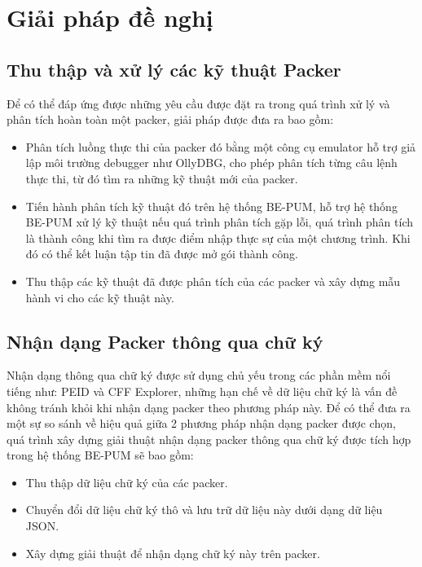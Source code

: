 \section{Giải pháp đề nghị}

\subsection {Thu thập và xử lý các kỹ thuật Packer}

\hspace{0.5cm}Để có thể đáp ứng được những yêu cầu được đặt ra trong quá trình xử lý và phân tích hoàn toàn một packer, giải pháp được đưa ra bao gồm:

\begin{itemize}
\item{Phân tích luồng thực thi của packer đó bằng một công cụ emulator hỗ trợ giả lập môi trường debugger như OllyDBG, cho phép phân tích từng câu lệnh thực thi, từ đó tìm ra những kỹ thuật mới của packer.\\}
\item{Tiến hành phân tích kỹ thuật đó trên hệ thống BE-PUM, hỗ trợ hệ thống BE-PUM xử lý kỹ thuật nếu quá trình phân tích gặp lỗi, quá trình phân tích là thành công khi tìm ra được điểm nhập thực sự của một chương trình. Khi đó có thể kết luận tập tin đã được mở gói thành công.\\}
\item{Thu thập các kỹ thuật đã được phân tích của các packer và xây dựng mẫu hành vi cho các kỹ thuật này.}
\end{itemize} 

\subsection {Nhận dạng Packer thông qua chữ ký}

\hspace{0.5cm}Nhận dạng thông qua chữ ký được sử dụng chủ yếu trong các phần mềm nổi tiếng như: PEID và CFF Explorer, những hạn chế về dữ liệu chữ ký là vấn đề không tránh khỏi khi nhận dạng packer theo phương pháp này. Để có thể đưa ra một sự so sánh về hiệu quả giữa 2 phương pháp nhận dạng packer được chọn, quá trình xây dựng giải thuật nhận dạng packer thông qua chữ ký được tích hợp trong hệ thống BE-PUM sẽ bao gồm:

\begin{itemize}
\item{Thu thập dữ liệu chữ ký của các packer.\\}
\item{Chuyển đổi dữ liệu chữ ký thô và lưu trữ dữ liệu này dưới dạng dữ liệu JSON.\\}
\item{Xây dựng giải thuật để nhận dạng chữ ký này trên packer.}
\end{itemize} 

